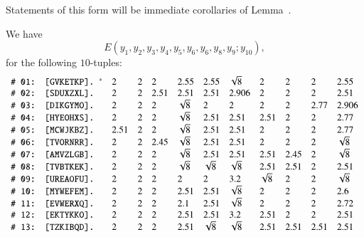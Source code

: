 Statements of this form will be immediate corollaries of Lemma~.

\newpage
\begin{lemma}\label{tarski:EE}
We have 
   $$
   E(y_1,y_2,y_3,y_4,y_5,y_6,y_6,y_8,y_9;y_{10}),
   $$
for the following $10$-tuples:
$$
\def\tuid#1{\text{\guid{#1}}}
\def\rr#1{\text{\tt \# #1:}}
\begin{array}{llllllllllll}
%
 \rr{01}&\tuid{GVKETKP} \tlabel{tarski:2t0-doesnt-pass-through}\usage{DCG-[4.19]{ lemma:2t0-doesnt-pass-through}}
   &2 &2 &2 & 2.55&  2.55 & \sqrt{8}&  2 & 2 & 2 & 2.55\\
%
 \rr{02}&\tuid{SDUXZXL}\tlabel{tarski:E1453}
   &2 &2 &2.51 &2.51& 2.51 &2.906& 2 & 2 &2 & 2.51\\ 
%
 \rr{03}&\tuid{DIKGYMO}\tlabel{tarski:dcg-p89}
   &2 &2 &2 &\sqrt8& 2 &2& 2 & 2 & 2.77 &2.906\\
%
 \rr{04}&\tuid{HYEOHXS}\tlabel{tarski:enclosed-v}
   &2 &2 &2 &\sqrt{8}& 2.51 &2.51& 2.51 & 2 & 2 &  2.77\\
%
 \rr{05}&\tuid{MCWJKBZ}\tlabel{tarski:277}
   &2.51 &2 &2 &\sqrt{8}& 2.51 &2.51& 2 & 2 & 2 & 2.77\\
%
 \rr{06}&\tuid{TVORNRR}\tlabel{tarski:245}
   &2 &2 &2.45 &\sqrt{8}& 2.51 &2.51& 2 & 2 & 2 & \sqrt{8}\\
%
 \rr{07}&\tuid{AMVZLGB}\tlabel{tarski:245bis}
   &2 &2 &2 &\sqrt{8}& 2.51 &2.51& 2.51 & 2.45 & 2 & \sqrt{8}\\
%
 \rr{08}&\tuid{TVBTKEK}\tlabel{tarski:node}
   &2 &2 &2 &\sqrt8& \sqrt8 &\sqrt8& 2.51 & 2.51 & 2 & 2.51\\
%
 \rr{09}&\tuid{UREAOFU}\tlabel{tarski:E:part4:1}
   &2 &2 &2 &  2& 2 &3.2&   \sqrt{8} & 2 & 2 &  \sqrt{8}\\
%
 \rr{10}&\tuid{MYWEFEM}\tlabel{tarski:E:part4:2}
   &2 &2 &2 &2.51 & 2.51  &\sqrt{8}&   2 & 2 & 2 &  2.6\\
%
 \rr{11}&\tuid{EVWERXQ}\tlabel{tarski:E:part4:3}
   &2 &2 &2 &2.1& 2.51  &\sqrt{8}&   2 & 2 & 2 &  2.72\\
%
 \rr{12}&\tuid{EKTYKKO}\tlabel{tarski:E:part4:4}
   &    2 &2 &2 &  2.51& 2.51 &3.2&   2.51 & 2 & 2 & 2.51\\
%
 \rr{13}&\tuid{TZKIBQD}\tlabel{tarski:E:part4:5}
   &2 &2 &2 &2.51& \sqrt{8} &\sqrt{8}& 2.51 & 2.51 & 2.51 & 2.51\\

\end{array}$$
\end{lemma}
